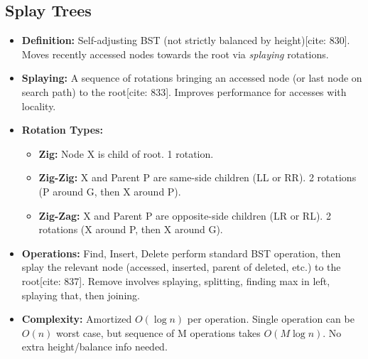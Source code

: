 \documentclass{article}
\begin{document}
\subsection{Splay Trees}
\begin{itemize}
    \item \textbf{Definition:} Self-adjusting BST (not strictly balanced by height)[cite: 830]. Moves recently accessed nodes towards the root via \textit{splaying} rotations.
    \item \textbf{Splaying:} A sequence of rotations bringing an accessed node (or last node on search path) to the root[cite: 833]. Improves performance for accesses with locality.
    \item \textbf{Rotation Types:}
          \begin{itemize}
              \item \textbf{Zig:} Node X is child of root. 1 rotation.
              \item \textbf{Zig-Zig:} X and Parent P are same-side children (LL or RR). 2 rotations (P around G, then X around P).
              \item \textbf{Zig-Zag:} X and Parent P are opposite-side children (LR or RL). 2 rotations (X around P, then X around G).
          \end{itemize}
    \item \textbf{Operations:} Find, Insert, Delete perform standard BST operation, then splay the relevant node (accessed, inserted, parent of deleted, etc.) to the root[cite: 837]. Remove involves splaying, splitting, finding max in left, splaying that, then joining.
    \item \textbf{Complexity:} Amortized $O(\log n)$ per operation. Single operation can be $O(n)$ worst case, but sequence of M operations takes $O(M \log n)$. No extra height/balance info needed.
\end{itemize}
\end{document}

